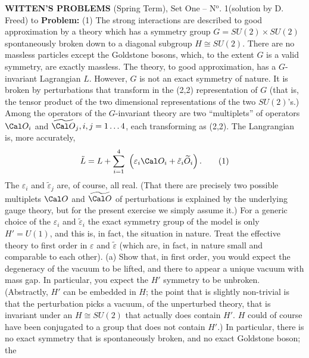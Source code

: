 

\nologo

\noindent
{\bf WITTEN'S PROBLEMS} (Spring Term), Set One --
N$^{\text{o}}$. 1\quad(solution by D. Freed)
\smallskip
\hbox to \hsize{\hrulefill}
\bigskip
\noindent
{\bf Problem:}
\medskip
(1)  The strong interactions are described to good
approximation by a theory which has a symmetry group
$G=SU(2)\times SU(2)$ spontaneously broken down to a
diagonal subgroup $H\cong SU(2)$. There are no massless
particles except the Goldstone bosons, which, to the extent
$G$ is a valid symmetry, are exactly massless.  The theory,
to good approximation, has a $G$-invariant Lagrangian $L$.
\medskip
However, $G$ is not an exact symmetry of nature.  It is
broken by perturbations that transform in the (2,2)
representation of $G$ (that is, the tensor product of the
two dimensional representations of the two $SU(2)$'s.)
Among the operators of the $G$-invariant theory are two
``multiplets'' of operators $\Cal O_i$ and $\widetilde{\Cal
O}_j,i,j=1\ldots4$, each transforming as (2,2).  The
Langrangian is, more accurately,
$$
\tilde L=L+\sum\limits^4_{i=1}\,\,\left(\varepsilon_i\Cal
O_i+\tilde\varepsilon_i\widetilde O_i\right).\tag1
$$
The $\varepsilon_i$ and $\tilde\varepsilon_j$ are, of
course, all real.  (That there are precisely two possible
multiplets $\Cal O$ and $\widetilde{\Cal O}$ of
perturbations is explained by the underlying gauge theory,
but for the present exercise we simply assume it.)
\medskip
For a generic choice of the $\varepsilon_i$ and
$\tilde\varepsilon_i$ the exact symmetry group of the model
is only $H'=U(1)$, and this is, in fact, the situation in
nature.
\medskip
Treat the effective theory to first order in $\varepsilon$
and $\tilde\varepsilon$ (which are, in fact, in nature small
and comparable to each other).
\medskip
(a)  Show that, in first order, you would expect the
degeneracy of the vacuum to be lifted, and there to appear
a unique vacuum with mass gap.  In particular, you expect
the $H'$ symmetry to be unbroken.  (Abstractly, $H'$ can be
embedded in $H$; the point that is slightly non-trivial is
that the perturbation picks a vacuum, of the unperturbed
theory, that is invariant under an $H\cong SU(2)$ that
actually does contain $H'$.  $H$ could of course have been
conjugated to a group that does not contain $H'$.)  In
particular, there is no exact symmetry that is
spontaneously broken, and no exact Goldstone boson; the
